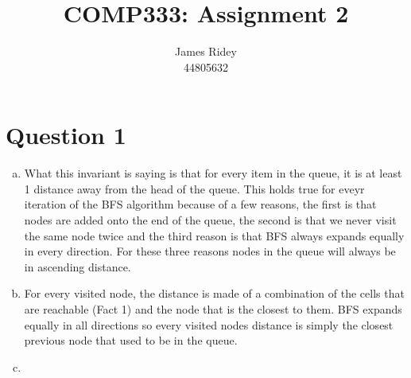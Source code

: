 \documentclass[journal,a4paper]{article}
\begin{document}
\onecolumn

\title{COMP333: Assignment 2}
\author{James Ridey\\
44805632}
\maketitle
%



\section*{Question 1}
\begin{enumerate}[(a)]
	\item What this invariant is saying is that for every item in the queue, it is at least 1 distance away from the head of the queue. This holds true for eveyr iteration of the BFS algorithm because of a few reasons, the first is that nodes are added onto the end of the queue, the second is that we never visit the same node twice and the third reason is that BFS always expands equally in every direction. For these three reasons nodes in the queue will always be in ascending distance.
	\item For every visited node, the distance is made of a combination of the cells that are reachable (Fact 1) and the node that is the closest to them. BFS expands equally in all directions so every visited nodes distance is simply the closest previous node that used to be in the queue.
	\item 
\end{enumerate}
\end{document}
